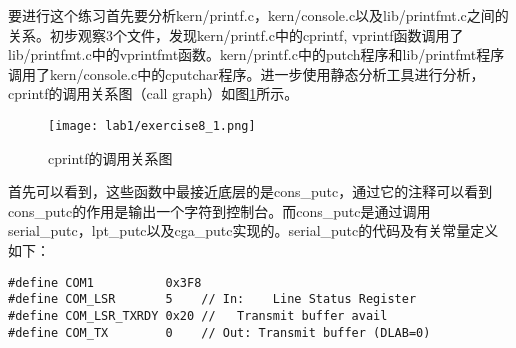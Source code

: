 \begin{exerciseSolution}{8}
\par 要进行这个练习首先要分析kern/printf.c，kern/console.c以及lib/printfmt.c之间的关系。初步观察3个文件，发现kern/printf.c中的cprintf, vprintf函数调用了lib/printfmt.c中的vprintfmt函数。kern/printf.c中的putch程序和lib/printfmt程序调用了kern/console.c中的cputchar程序。进一步使用静态分析工具进行分析，cprintf的调用关系图（call graph）如图\ref{fig:exercise8_1}所示。
\begin{figure}[htb]
    \centering
    \texttt{[image: lab1/exercise8\_1.png]}
    \caption{cprintf的调用关系图}
    \label{fig:exercise8_1}
\end{figure}

\par 首先可以看到，这些函数中最接近底层的是cons\_putc，通过它的注释可以看到cons\_putc的作用是输出一个字符到控制台。而cons\_putc是通过调用serial\_putc，lpt\_putc以及cga\_putc实现的。serial\_putc的代码及有关常量定义如下：
\begin{lstlisting}
#define COM1          0x3F8
#define COM_LSR       5    // In:    Line Status Register
#define COM_LSR_TXRDY 0x20 //   Transmit buffer avail
#define COM_TX        0    // Out: Transmit buffer (DLAB=0)


\end{lstlisting}
\end{exerciseSolution}
